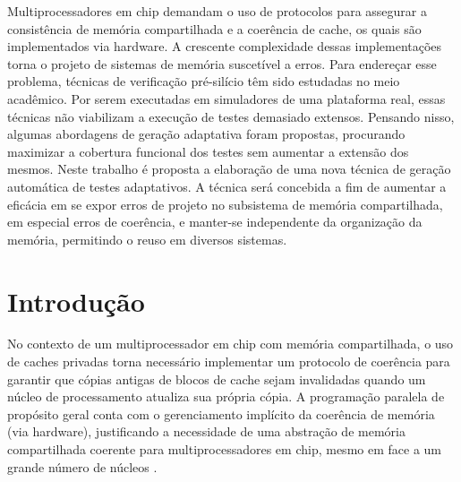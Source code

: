 \documentclass{ufsc-thesis} %
\newcommand{\critico}[1]{{\color{red}\textbf{{#1}}}}
\begin{document}
\clearpage
\par Multiprocessadores em chip demandam o uso de protocolos para assegurar a consistência de
memória compartilhada e a coerência de cache, os quais são implementados via hardware. A
crescente complexidade dessas implementações torna o projeto de sistemas de memória suscetível
a erros. Para endereçar esse problema, técnicas de verificação pré-silício têm sido estudadas
no meio acadêmico. Por serem executadas em simuladores de uma plataforma real, essas técnicas
não viabilizam a execução de testes demasiado extensos. Pensando nisso, algumas abordagens de
geração adaptativa foram propostas, procurando maximizar a cobertura funcional dos testes sem
aumentar a extensão dos mesmos. Neste trabalho é proposta a elaboração de uma nova técnica de
geração automática de testes adaptativos. A técnica será concebida a fim de aumentar a eficácia
em se expor erros de projeto no subsistema de memória compartilhada, em especial erros de
coerência, e manter-se independente da organização da memória, permitindo o reuso em diversos
sistemas.

%


\newpage
\tableofcontents

\chapter{Introdução}

No contexto de um multiprocessador em chip com memória compartilhada, o uso de caches privadas
torna necessário implementar um protocolo de coerência para garantir que cópias antigas de
blocos de cache sejam invalidadas quando um núcleo de processamento atualiza sua própria cópia.
A programação paralela de propósito geral conta com o gerenciamento implícito da coerência de
memória (via hardware), justificando a necessidade de uma abstração de memória compartilhada
coerente para multiprocessadores em chip, mesmo em face a um grande número de núcleos \cite{Devadas:2013}.
\end{document}
